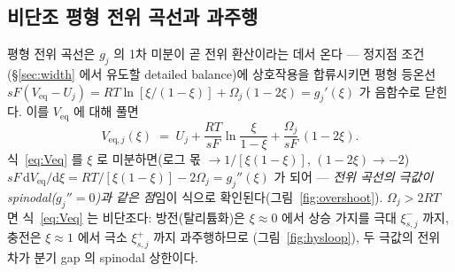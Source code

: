 \documentclass[11pt,a4paper]{article}
\newcommand{\dd}{\mathrm{d}}
\newcommand{\eq}{\mathrm{eq}}
\begin{document}
\subsection{비단조 평형 전위 곡선과 과주행}
평형 전위 곡선은 $g_j$ 의 1차 미분이 곧 전위 환산이라는 데서 온다 — 정지점 조건(\S\ref{sec:width} 에서 유도할
detailed balance)에 상호작용을 합류시키면 평형 등온선 $sF(V_\eq-U_j)=RT\ln[\xi/(1-\xi)]+\Omega_j(1-2\xi)=g_j'(\xi)$ 가
음함수로 닫힌다. 이를 $V_\eq$ 에 대해 풀면
\begin{equation}
V_{\eq,j}(\xi)\;=\;U_j+\frac{RT}{sF}\ln\frac{\xi}{1-\xi}+\frac{\Omega_j}{sF}\,(1-2\xi).
\label{eq:Veq}
\end{equation}
식~\eqref{eq:Veq} 를 $\xi$ 로 미분하면(로그 몫 $\to1/[\xi(1-\xi)]$, $(1-2\xi)\to-2$) $sF\,\dd V_\eq/\dd\xi=
RT/[\xi(1-\xi)]-2\Omega_j=g_j''(\xi)$ 가 되어 — \emph{전위 곡선의 극값이 spinodal($g_j''=0$)과 같은 점}임이 식으로
확인된다(그림~\ref{fig:overshoot}). $\Omega_j>2RT$ 면 식~\eqref{eq:Veq} 는 비단조다: 방전(탈리튬화)은 $\xi\!\approx\!0$
에서 상승 가지를 극대 $\xi_{s,j}^-$ 까지, 충전은 $\xi\!\approx\!1$ 에서 극소 $\xi_{s,j}^+$ 까지 과주행하므로
(그림~\ref{fig:hysloop}), 두 극값의 전위 차가 분기 gap 의 spinodal 상한이다.
\end{document}
